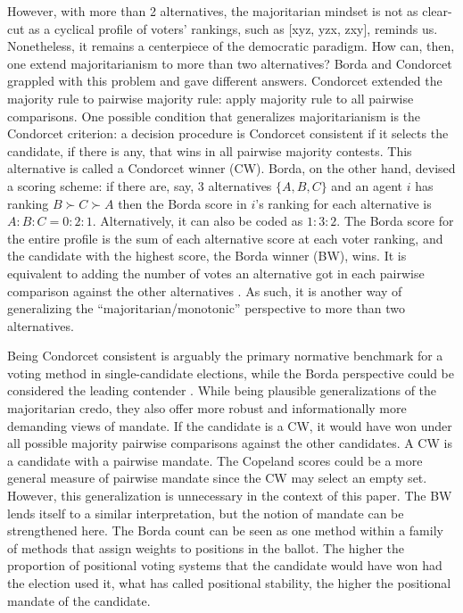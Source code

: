 \documentclass[hidelinks,11pt]{article} \usepackage[utf8]{inputenc}
\begin{document}
However, with more than 2 alternatives, the majoritarian mindset is not as clear-cut as a cyclical profile of voters' rankings, such as [xyz, yzx, zxy], reminds us. Nonetheless, it remains a centerpiece of the democratic paradigm. How can, then, one extend majoritarianism to more than two alternatives? Borda and Condorcet grappled with this problem and gave different answers. Condorcet extended the majority rule to pairwise majority rule: apply majority rule to all pairwise comparisons. One possible condition that generalizes majoritarianism is the Condorcet criterion: a decision procedure is Condorcet consistent if it selects the candidate, if there is any, that wins in all pairwise majority contests. This alternative is called a Condorcet winner (CW). Borda, on the other hand, devised a scoring scheme: if there are, say, 3 alternatives \(\{A,B,C\}\) and an agent \(i\) has ranking \(B\succ C\succ A\) then the Borda score in \(i\)'s ranking for each alternative is \(A:B:C = 0:2:1\). Alternatively, it can also be coded as \(1:3:2\). The Borda score for the entire profile is the sum of each alternative score at each voter ranking, and the candidate with the highest score, the Borda winner (BW), wins. It is equivalent to adding the number of votes an alternative got in each pairwise comparison against the other alternatives \parencite{nurmi1999voting}. As such, it is another way of generalizing the ``majoritarian/monotonic'' perspective to more than two alternatives.


Being Condorcet consistent is arguably the primary normative benchmark for a voting method in single-candidate elections, while the Borda perspective could be considered the leading contender \parencite{regenwetter2006behavioral,   felsenthal2011review, nurmi2002voting}. While being plausible generalizations of the majoritarian credo, they also offer more robust and informationally more demanding views of mandate. If the candidate is a CW, it would have won under all possible majority pairwise comparisons against the other candidates. A CW is a candidate with a pairwise mandate. The Copeland scores could be a more general measure of pairwise mandate since the CW may select an empty set. However, this generalization is unnecessary in the context of this paper. The BW lends itself to a similar interpretation, but the notion of mandate can be strengthened here. The Borda count can be seen as one method within a family of methods that assign weights to positions in the ballot. The higher the proportion of positional voting systems that the candidate would have won had the election used it, what \textcite{tabarrok2001president} has called positional stability, the higher the positional mandate of the candidate.
\end{document}
